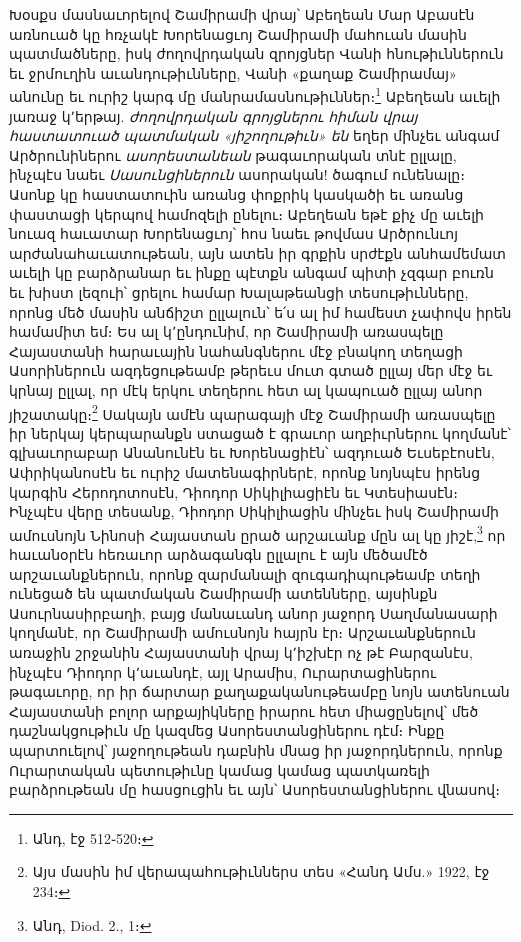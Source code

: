 \documentclass{article}
\begin{document}
{Խօսքս մասնաւորելով Շամիրամի վրայ՝ Աբեղեան Մար Աբասէն առնուած կը հռչակէ Խորենացւոյ Շամիրամի մահուան մասին պատմածները, իսկ ժողովրդական զրոյցներ Վանի հնութիւններուն եւ ջրմուղին աւանդութիւնները, Վանի «քաղաք Շամիրամայ» անունը եւ ուրիշ կարգ մը մանրամասնութիւններ։\footnote{Անդ, էջ 512֊520։} Աբեղեան աւելի յառաջ կ՚երթայ. \emph{ժողովրդական գրոյցներու հիման վրայ հաստատուած պատմական «յիշողութիւն» են} եղեր մինչեւ անգամ Արծրունիներու \emph{ասորեստանեան} թագաւորական տնէ ըլլալը, ինչպէս նաեւ \emph{Սասունցիներուն} ասորական! ծագում ունենալը։ Ասոնք կը հաստատուին առանց փոքրիկ կասկածի եւ առանց փաստացի կերպով համոզելի ընելու։ Աբեղեան եթէ քիչ մը աւելի նուազ հաւատար Խորենացւոյ՝ հոս նաեւ թովմաս Արծրունւոյ արժանահաւատութեան, այն ատեն իր գրքին սրժէքն անհամեմատ աւելի կը բարձրանար եւ ինքը պէտքն անգամ պիտի չզգար բուռն եւ խիստ լեզուի՝ ցրելու համար Խալաթեանցի տեսութիւնները, որոնց մեծ մասին անճիշտ ըլլալուն՝ ե՛ս ալ իմ համեստ չափովս իրեն համամիտ եմ։ Ես ալ կ՚ընդունիմ, որ Շամիրամի առասպելը Հայաստանի հարաւային նահանգներու մէջ բնակող տեղացի Ասորիներուն ազդեցութեամբ թերեւս մուտ գտած ըլլայ մեր մէջ եւ կրնայ ըլլալ, որ մէկ երկու տեղերու հետ ալ կապուած ըլլայ անոր յիշատակը։\footnote{Այս մասին իմ վերապահութիւններս տես «Հանդ Ամս.» 1922, էջ 234։} Սակայն ամէն պարագայի մէջ Շամիրամի առասպելը իր ներկայ կերպարանքն ստացած է գրաւոր աղբիւրներու կողմանէ՝ գլխաւորաբար Անանունէն եւ Խորենացիէն՝ ազդուած Եւսեբէոսէն, Ափրիկանոսէն եւ ուրիշ մատենագիրներէ, որոնք նոյնպէս իրենց կարգին Հերոդոտոսէն, Դիոդոր Սիկիլիացիէն եւ Կտեսիասէն։ Ինչպէս վերը տեսանք, Դիոդոր Սիկիլիացին մինչեւ իսկ Շամիրամի ամուսնոյն Նինոսի Հայաստան ըրած արշաւանք մըն ալ կը յիշէ,\footnote{Անդ, Diod. 2., 1։} որ հաւանօրէն հեռաւոր արձագանգն ըլլալու է այն մեծամէծ արշաւանքներուն, որոնք զարմանալի զուգադիպութեամբ տեղի ունեցած են պատմական Շամիրամի ատենները, այսինքն Ասուրնասիրբաղի, բայց մանաւանդ անոր յաջորդ Սաղմանասարի կողմանէ, որ Շամիրամի ամուսնոյն հայրն էր։ Արշաւանքներուն առաջին շրջանին Հայաստանի վրայ կ՚իշխէր ոչ թէ Բարզանէս, ինչպէս Դիոդոր կ՚աւանդէ, այլ Արամիս, Ուրարտացիներու թագաւորը, որ իր ճարտար քաղաքականութեամբը նոյն ատենուան Հայաստանի բոլոր արքայիկները իրարու հետ միացընելով՝ մեծ դաշնակցութիւն մը կազմեց Ասորեստանցիներու դէմ։ Ինքը պարտուելով՝ յաջողութեան դաբնին մնաց իր յաջորդներուն, որոնք Ուրարտական պետութիւնը կամաց կամաց պատկառելի բարձրութեան մը հասցուցին եւ այն՝ Ասորեստանցիներու վնասով։

}
\end{document}
